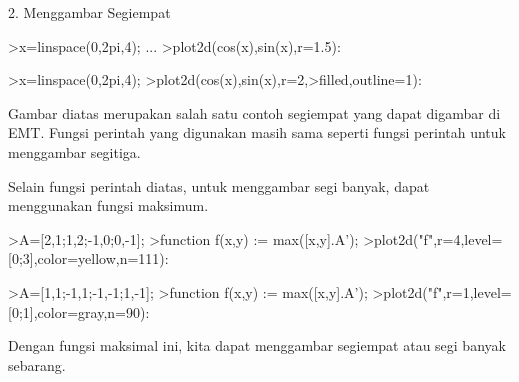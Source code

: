 \documentclass[a4paper,10pt]{article}
\begin{document}
\begin{eulernotebook}
\begin{eulercomment}
\begin{eulercomment}
\begin{eulercomment}
\begin{eulercomment}
\begin{eulercomment}
\begin{eulercomment}
\begin{eulercomment}
\begin{eulercomment}
\begin{eulercomment}
2. Menggambar Segiempat
\end{eulercomment}
\begin{eulerprompt}
>x=linspace(0,2pi,4); ...
>plot2d(cos(x),sin(x),r=1.5):
\end{eulerprompt}
\begin{eulerprompt}
>x=linspace(0,2pi,4); 
>plot2d(cos(x),sin(x),r=2,>filled,outline=1):
\end{eulerprompt}
\begin{eulercomment}
Gambar diatas merupakan salah satu contoh segiempat yang dapat
digambar di EMT. Fungsi perintah yang digunakan masih sama seperti
fungsi perintah untuk menggambar segitiga. 

Selain fungsi perintah diatas, untuk menggambar segi banyak, dapat
menggunakan fungsi maksimum.
\end{eulercomment}
\begin{eulerprompt}
>A=[2,1;1,2;-1,0;0,-1];
>function f(x,y) := max([x,y].A');
>plot2d("f",r=4,level=[0;3],color=yellow,n=111):
\end{eulerprompt}
\begin{eulerprompt}
>A=[1,1;-1,1;-1,-1;1,-1];
>function f(x,y) := max([x,y].A');
>plot2d("f",r=1,level=[0;1],color=gray,n=90):
\end{eulerprompt}
\begin{eulercomment}
Dengan fungsi maksimal ini, kita dapat menggambar segiempat atau segi
banyak sebarang.



\end{eulercomment}
\end{eulercomment}
\end{eulercomment}
\end{eulercomment}
\end{eulercomment}
\end{eulercomment}
\end{eulercomment}
\end{eulercomment}
\end{eulercomment}
\end{eulernotebook}
\end{document}
